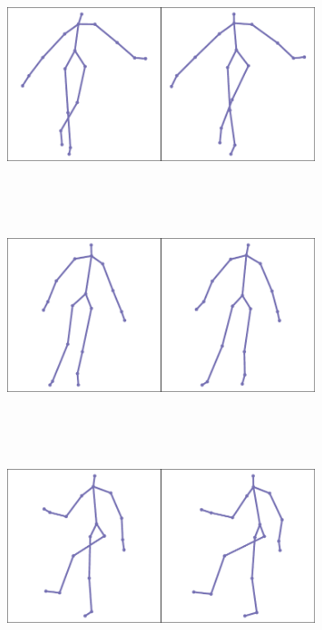 \begin{figure}
\centering
\begin{subfigure}[b]{0.4\textwidth}
  \includegraphics[width=\textwidth]{images/binocular-pose-obs-1.pdf}
  \vspace{1cm}
\end{subfigure}
~~
\begin{subfigure}[b]{0.55\textwidth}
\end{subfigure}
\\[5mm]
\begin{subfigure}[b]{0.4\textwidth}
  \includegraphics[width=\textwidth]{images/binocular-pose-obs-2.pdf}
  \vspace{1cm}
\end{subfigure}
~~
\begin{subfigure}[b]{0.55\textwidth}
\end{subfigure}
\\[5mm]
\begin{subfigure}[b]{0.4\textwidth}
  \includegraphics[width=\textwidth]{images/binocular-pose-obs-3.pdf}

\end{subfigure}
\end{figure}
